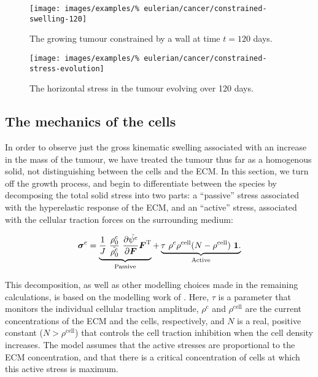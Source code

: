 \begin{figure}[!hptb]
\centering
\texttt{[image: images/examples/\%
eulerian/cancer/constrained-swelling-120]}
\caption{The growing tumour constrained by a wall at time $t=120$ days.}
\label{tumour-constrained-swelling-120}
\end{figure}

\begin{figure}[!hptb]
\centering
\texttt{[image: images/examples/\%
eulerian/cancer/constrained-stress-evolution]}
\caption{The horizontal stress in the tumour evolving over 120 days.}
\label{tumour-constrained-stress-evolution}
\end{figure}

\clearpage

\subsection{The mechanics of the cells}
\label{cell-roles}

In order to observe just the gross kinematic swelling associated with
an increase in the mass of the tumour, we have treated the tumour thus
far as a homogenous solid, not distinguishing between the cells and
the ECM. In this section, we turn off the growth process, and begin to
differentiate between the species by decomposing the total solid
stress into two parts: a ``passive'' stress associated with the
hyperelastic response of the ECM, and an ``active'' stress, associated
with the cellular traction forces on the surrounding medium:

\begin{equation}
\mbox{\boldmath$\sigma$}^{\mathrm{c}} =
\underbrace{\frac{1}{J}\ \frac{\rho_{0}^{\mathrm{c}}}
  {\tilde{\rho_{0}^{\mathrm{c}}}}\    
\frac{\partial \hat{\psi^{\mathrm{c}}}}{\partial
  \mbox{\boldmath$ F$}}  \mbox{\boldmath$ F$}^{\mathrm{T}} }_{\text{Passive}}
+ \underbrace{\tau\ \rho^{\mathrm{c}} \rho^{\mathrm{cell}}
(N - \rho^{\mathrm{cell}})\ {\bf 1}.
}_{\text{Active}}
\label{activepassivesplit}
\end{equation}

\noindent This decomposition, as well as other modelling choices made
in the remaining calculations, is based on the modelling work of
\citet{namyetal:04}. Here, $\tau$ is a parameter that monitors the
individual cellular traction amplitude, $\rho^{\mathrm{c}}$ and
$\rho^{\mathrm{cell}}$ are the current concentrations of the ECM and
the cells, respectively, and $N$ is a real, positive constant
($N>\rho^{\mathrm{cell}}$) that controls the cell traction inhibition
when the cell density increases. The model assumes that the active
stresses are proportional to the ECM concentration, and that there is
a critical concentration of cells at which this active stress is
maximum.

